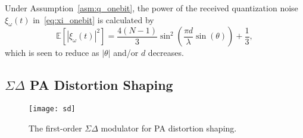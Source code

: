 \documentclass[10pt,twocolumn,twoside]{IEEEtran}
\begin{document}
\noindent
Under Assumption~\ref{asm:q_onebit}, the power of the received quantization noise $\xi_\omega(t)$ in~\eqref{eq:xi_onebit} is calculated by
\[
\mathbb{E}[|\xi_\omega(t)|^2] =
\frac{4(N-1)}{3}   \sin^2 \left( \frac{\pi d}{\lambda} \sin(\theta)\right) + \frac{1}{3},
\]
which is seen to reduce as $|\theta|$ and/or $d$ decreases.


\subsection{${\Sigma \Delta}$ PA Distortion Shaping}
\label{sec:sd}

\begin{figure}[t]
	\centering
	\texttt{[image: sd]}
	\caption{The first-order ${\Sigma \Delta}$ modulator for PA distortion shaping.}
	\label{fig:sd}
\end{figure}
\end{document}
